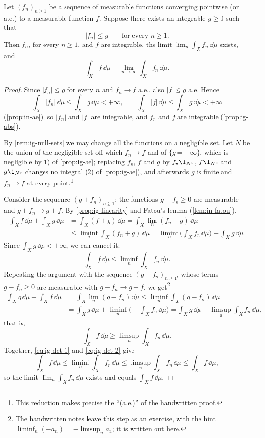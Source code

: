 \begin{theorem}\label{thm:ig-dominated-convergence}
Let $(f_n)_{n\ge1}$ be a sequence of measurable functions converging pointwise (or a.e.) to a
measurable function $f$. Suppose there exists an integrable $g\ge0$ such that
\[
  |f_n|\le g\qquad\text{for every } n\ge1 .
\]
Then $f_n$, for every $n\ge1$, and $f$ are integrable, the limit $\lim_n\int_Xf_n\,\dd\mu$
exists, and
\[
  \int_Xf\,\dd\mu=\lim_{n\to\infty}\int_Xf_n\,\dd\mu .
\]
\end{theorem}

\begin{proof}
Since $|f_n|\le g$ for every $n$ and $f_n\to f$ a.e., also $|f|\le g$ a.e. Hence
\[
  \int_X|f_n|\,\dd\mu\le\int_Xg\,\dd\mu<+\infty,\qquad\int_X|f|\,\dd\mu\le\int_Xg\,\dd\mu<+\infty
\]
(\cref{prop:in-ae}), so $|f_n|$ and $|f|$ are integrable, and $f_n$ and $f$ are integrable
(\cref{prop:ig-abs}).

By \cref{rem:ig-null-sets} we may change all the functions on a negligible set. Let $N$ be the
union of the negligible set off which $f_n\to f$ and of $\{g=+\infty\}$, which is negligible by
1) of \cref{prop:ig-ae}; replacing $f_n$, $f$ and $g$ by $f_n\1_{N^c}$, $f\1_{N^c}$ and
$g\1_{N^c}$ changes no integral (2) of \cref{prop:ig-ae}), and afterwards $g$ is finite and
$f_n\to f$ at every point.\footnote{This reduction makes precise the ``(a.e.)'' of the
handwritten proof.}

Consider the sequence $(g+f_n)_{n\ge1}$: the functions $g+f_n\ge0$ are measurable and
$g+f_n\to g+f$. By \cref{prop:ig-linearity} and Fatou's lemma (\cref{lem:in-fatou}),
\begin{align*}
  \int_Xf\,\dd\mu+\int_Xg\,\dd\mu&=\int_X(f+g)\,\dd\mu=\int_X\lim_n(f_n+g)\,\dd\mu\\
  &\le\liminf_n\int_X(f_n+g)\,\dd\mu=\liminf_n\Big(\int_Xf_n\,\dd\mu\Big)+\int_Xg\,\dd\mu .
\end{align*}
Since $\int_Xg\,\dd\mu<+\infty$, we can cancel it:
\begin{equation}\label{eq:ig-dct-1}
  \int_Xf\,\dd\mu\le\liminf_n\int_Xf_n\,\dd\mu .
\end{equation}
Repeating the argument with the sequence $(g-f_n)_{n\ge1}$, whose terms $g-f_n\ge0$ are
measurable with $g-f_n\to g-f$, we get\footnote{The handwritten notes leave this step as an
exercise, with the hint $\liminf_n(-a_n)=-\limsup_na_n$; it is written out here.}
\begin{align*}
  \int_Xg\,\dd\mu-\int_Xf\,\dd\mu&=\int_X\lim_n(g-f_n)\,\dd\mu\le\liminf_n\int_X(g-f_n)\,\dd\mu\\
  &=\int_Xg\,\dd\mu+\liminf_n\Big(-\int_Xf_n\,\dd\mu\Big)
  =\int_Xg\,\dd\mu-\limsup_n\int_Xf_n\,\dd\mu,
\end{align*}
that is,
\begin{equation}\label{eq:ig-dct-2}
  \int_Xf\,\dd\mu\ge\limsup_n\int_Xf_n\,\dd\mu .
\end{equation}
Together, \eqref{eq:ig-dct-1} and \eqref{eq:ig-dct-2} give
\[
  \int_Xf\,\dd\mu\le\liminf_n\int_Xf_n\,\dd\mu\le\limsup_n\int_Xf_n\,\dd\mu\le\int_Xf\,\dd\mu,
\]
so the limit $\lim_n\int_Xf_n\,\dd\mu$ exists and equals $\int_Xf\,\dd\mu$.
\end{proof}


